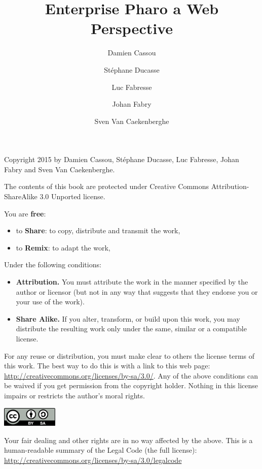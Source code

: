 \documentclass[10pt,twoside,english,showtrims]{support/latex/sbabook}
\title{Enterprise Pharo\titlebreak{:} a Web Perspective}
\author{
    Damien Cassou \and
    Stéphane Ducasse \and
    Luc Fabresse \and
    Johan Fabry \and
    Sven Van Caekenberghe}
\date{\gitdate\titlebreak[\smallskip]{ -- }\protect\gitCommitInfo}
\begin{document}
\begin{titlingpage}
    \maketitle
\end{titlingpage}

\frontmatter

Copyright 2015 by Damien Cassou, St\'{e}phane Ducasse, Luc Fabresse,
Johan Fabry and Sven Van Caekenberghe.

The contents of this book are protected under Creative Commons
Attribution-ShareAlike 3.0 Unported license.

You are \textbf{free}:

\begin{itemize}
\item to \textbf{Share}: to copy, distribute and transmit the work,
\item to \textbf{Remix}: to adapt the work,
\end{itemize}

Under the following conditions:

\begin{itemize}
\item \textbf{Attribution.} You must attribute the work in the manner
  specified by the author or licensor (but not in any way that
  suggests that they endorse you or your use of the work).
\item \textbf{Share Alike.} If you alter, transform, or build upon
  this work, you may distribute the resulting work only under the
  same, similar or a compatible license.
\end{itemize}

For any reuse or distribution, you must make clear to others the
license terms of this work. The best way to do this is with a link to
this web page: \url{http://creativecommons.org/licenses/by-sa/3.0/}.
Any of the above conditions can be waived if you get permission from
the copyright holder. Nothing in this license impairs or restricts the
author's moral rights.

\includegraphics[width=0.2\textwidth]{support/latex/CreativeCommons-BY-SA.pdf}

Your fair dealing and other rights are in no way affected by the
above. This is a human-readable summary of the Legal Code (the full
license):
\url{http://creativecommons.org/licenses/by-sa/3.0/legalcode}
\end{document}
